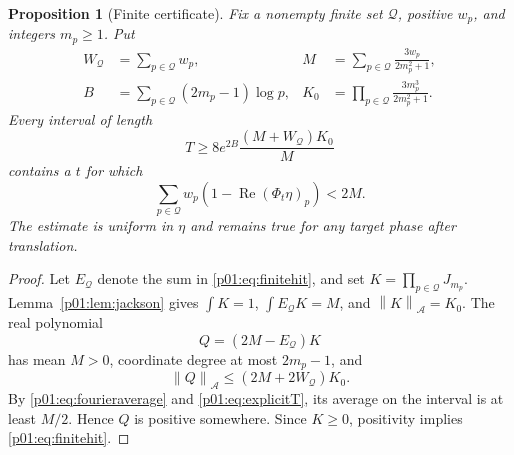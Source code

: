 \documentclass[11pt,letterpaper]{article}
\newtheorem{proposition}[theorem]{Proposition}
\theoremstyle{definition}
\theoremstyle{remark}
\newcommand{\norm}[1]{\left\lVert#1\right\rVert}
\newcommand{\Ree}{\operatorname{Re}}
\newcommand{\1}{\mathbf 1}
\begin{document}
\begin{proposition}[Finite certificate]\label{p01:prop:certificate}
Fix a nonempty finite set $\mathcal Q$, positive $w_p$, and integers $m_p\ge1$.
Put
\begin{align*}
 W_{\mathcal Q}&=\sum_{p\in\mathcal Q}w_p,&
 M&=\sum_{p\in\mathcal Q}\frac{3w_p}{2m_p^2+1},\\
 B&=\sum_{p\in\mathcal Q}(2m_p-1)\log p,&
 K_0&=\prod_{p\in\mathcal Q}\frac{3m_p^3}{2m_p^2+1}.
\end{align*}
Every interval of length
\begin{equation}\label{p01:eq:explicitT}
 T\ge 8e^{2B}\frac{(M+W_{\mathcal Q})K_0}{M}
\end{equation}
contains a $t$ for which
\begin{equation}\label{p01:eq:finitehit}
 \sum_{p\in\mathcal Q}w_p(1-\Ree(\Phi_t\eta)_p)<2M.
\end{equation}
The estimate is uniform in $\eta$ and remains true for any target phase
after translation.
\end{proposition}
\begin{proof}
Let $E_{\mathcal Q}$ denote the sum in \eqref{p01:eq:finitehit}, and set
$K=\prod_{p\in\mathcal Q}J_{m_p}$. Lemma~\ref{p01:lem:jackson} gives
$\int K=1$, $\int E_{\mathcal Q}K=M$, and
$\norm K_{\mathcal A}=K_0$. The real polynomial
\[
 Q=(2M-E_{\mathcal Q})K
\]
has mean $M>0$, coordinate degree at most $2m_p-1$, and
\[
 \norm Q_{\mathcal A}
 \le(2M+2W_{\mathcal Q})K_0.
\]
By \eqref{p01:eq:fourieraverage} and \eqref{p01:eq:explicitT}, its average on
the interval is at least $M/2$. Hence $Q$ is positive somewhere. Since
$K\ge0$, positivity implies \eqref{p01:eq:finitehit}.
\end{proof}
\end{document}
